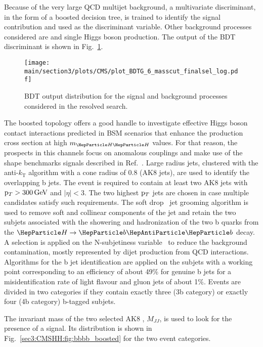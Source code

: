 Because of the very large QCD multijet background, a multivariate discriminant, in the form of a boosted decision tree, is trained to identify the \HH signal contribution and used as the discriminant variable.
Other background processes considered are \ttbar and single Higgs boson production.
The output of the BDT discriminant is shown in Fig.~\ref{sec3:CMSHH:fig:bbbb_BDT}.

\begin{figure}[!htb]
\centering 
\texttt{[image: \\main/section3/plots/CMS/plot\_BDTG\_6\_masscut\_finalsel\_log.pdf]}
\caption{BDT output distribution for the signal and background processes considered in the \bbbb resolved search.} 
\label{sec3:CMSHH:fig:bbbb_BDT} 
\end{figure}

The boosted topology offers a good handle to investigate effective Higgs boson contact interactions predicted in BSM scenarios that enhance the \HH production cross section at high $m_{\HH}$ values.
For that reason, the prospects in this channels focus on anomalous couplings and make use of the shape benchmarks signals described in Ref.~\cite{Carvalho2016}.
Large radius jets, clustered with the anti-$k_\text{T}$ algorithm with a cone radius of 0.8 (AK8 jets), are used to identify the  overlapping b jets.
The event is required to contain at least two AK8 jets with $\mathrm{p}_{T} > 300\,\text{Ge\hspace{-.08em}V}$ and $|\eta| < 3$.
The two highest $\mathrm{p}_{T}$ jets are chosen in case multiple candidates satisfy such requirements.
The soft drop~\cite{Dasgupta:2013ihk,Larkoski:2014wba} jet grooming algorithm is used to remove soft and collinear components of the jet and retain the two subjets associated with the showering and hadronization of the two b quarks from the $\PH\to\PQb\PAQb$ decay.
A selection is applied on the N-subjetiness variable~\cite{Thaler:2011gf} to reduce the background contamination, mostly represented by dijet production from QCD interactions.
Algorithms for the b jet identification are applied on the subjets with a working point corresponding to an efficiency of about 49\% for genuine b jets for a misidentification rate of light flavour and gluon jets of about 1\%.
Events are divided in two categories if they contain exactly three (3b category) or exactly four (4b category) b-tagged subjets.

The invariant mass of the two selected AK8 , $M_{JJ}$, is used to look for the presence of a signal. Its distribution is shown in Fig.~\ref{sec3:CMSHH:fig:bbbb_boosted} for the two event categories.

